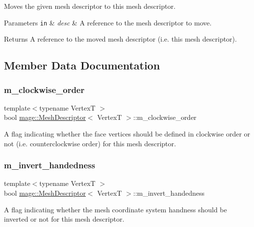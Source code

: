 Moves the given mesh descriptor to this mesh descriptor.


\begin{DoxyParams}[1]{Parameters}
\mbox{\tt in}  & {\em desc} & A reference to the mesh descriptor to move. \\
\hline
\end{DoxyParams}
\begin{DoxyReturn}{Returns}
A reference to the moved mesh descriptor (i.\+e. this mesh descriptor). 
\end{DoxyReturn}


\subsection{Member Data Documentation}
\hypertarget{structmage_1_1_mesh_descriptor_a7e769c8d1d81b3514b951b306865dc88}{}\label{structmage_1_1_mesh_descriptor_a7e769c8d1d81b3514b951b306865dc88} 
\subsubsection{\texorpdfstring{m\+\_\+clockwise\+\_\+order}{m\_clockwise\_order}}
{\footnotesize\ttfamily template$<$typename VertexT $>$ \\
bool \hyperlink{structmage_1_1_mesh_descriptor}{mage\+::\+Mesh\+Descriptor}$<$ VertexT $>$\+::m\+\_\+clockwise\+\_\+order\hspace{0.3cm}{\ttfamily [private]}}

A flag indicating whether the face vertices should be defined in clockwise order or not (i.\+e. counterclockwise order) for this mesh descriptor. \hypertarget{structmage_1_1_mesh_descriptor_af7b8124e44ac65ca2088d5d8ca0639f5}{}\label{structmage_1_1_mesh_descriptor_af7b8124e44ac65ca2088d5d8ca0639f5} 
\subsubsection{\texorpdfstring{m\+\_\+invert\+\_\+handedness}{m\_invert\_handedness}}
{\footnotesize\ttfamily template$<$typename VertexT $>$ \\
bool \hyperlink{structmage_1_1_mesh_descriptor}{mage\+::\+Mesh\+Descriptor}$<$ VertexT $>$\+::m\+\_\+invert\+\_\+handedness\hspace{0.3cm}{\ttfamily [private]}}

A flag indicating whether the mesh coordinate system handness should be inverted or not for this mesh descriptor. 